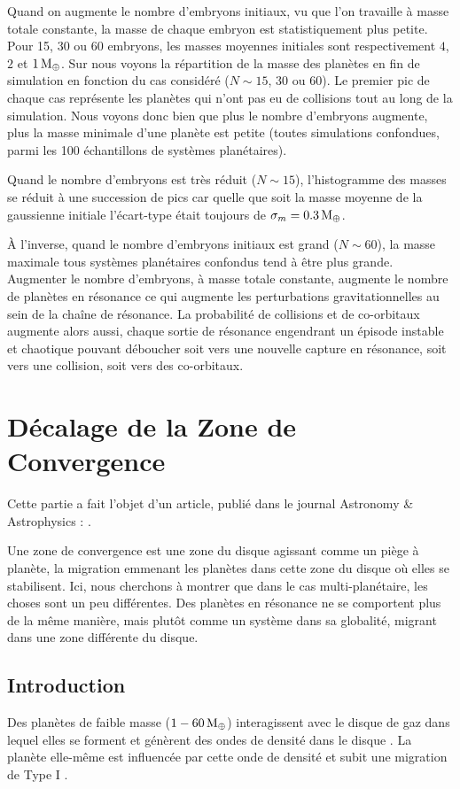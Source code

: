Quand on augmente le nombre d'embryons initiaux, vu que l'on travaille à masse totale constante, la masse de chaque embryon est statistiquement plus petite. Pour 15, 30 ou 60 embryons, les masses moyennes initiales sont respectivement $4$, $2$ et $1\mathrm{\thinspace M_\oplus}$. Sur  nous voyons la répartition de la masse des planètes en fin de simulation en fonction du cas considéré ($N\sim 15$, 30 ou 60). Le premier pic de chaque cas représente les planètes qui n'ont pas eu de collisions tout au long de la simulation. Nous voyons donc bien que plus le nombre d'embryons augmente, plus la masse minimale d'une planète est petite (toutes simulations confondues, parmi les 100 échantillons de systèmes planétaires). 

Quand le nombre d'embryons est très réduit ($N\sim 15$), l'histogramme des masses se réduit à une succession de pics car quelle que soit la masse moyenne de la gaussienne initiale l'écart-type était toujours de $\sigma_m = 0.3\mathrm{\thinspace M_\oplus}$. 

À l'inverse, quand le nombre d'embryons initiaux est grand ($N\sim 60$), la masse maximale tous systèmes planétaires confondus tend à être plus grande. Augmenter le nombre d'embryons, à masse totale constante, augmente le nombre de planètes en résonance ce qui augmente les perturbations gravitationnelles au sein de la chaîne de résonance. La probabilité de collisions et de co-orbitaux augmente alors aussi, chaque sortie de résonance engendrant un épisode instable et chaotique pouvant déboucher soit vers une nouvelle capture en résonance, soit vers une collision, soit vers des co-orbitaux. 

\section{Décalage de la Zone de Convergence}\label{sec:shifted_CZ}
Cette partie a fait l'objet d'un article, publié dans le journal Astronomy \& Astrophysics : \cite{cossou2013convergence}.

Une zone de convergence est une zone du disque agissant comme un piège à planète, la migration emmenant les planètes dans cette zone du disque où elles se stabilisent. Ici, nous cherchons à montrer que dans le cas multi-planétaire, les choses sont un peu différentes. Des planètes en résonance ne se comportent plus de la même manière, mais plutôt comme un système dans sa globalité, migrant dans une zone différente du disque.

\subsection{Introduction}
Des planètes de faible masse ($1-60\mathrm{\thinspace M_\oplus}$) interagissent avec le disque de gaz dans lequel elles se forment et génèrent des
ondes de densité dans le disque \citep{goldreich1979excitation}. La planète elle-même est influencée par cette onde de densité
et subit une migration de Type I \citep{ward1997protoplanet}.

